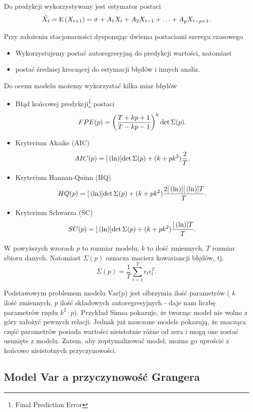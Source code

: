 \documentclass[10pt,a4paper]{book}
\begin{document}
Do predykcji wykorzystywany jest estymator postaci
$$
\predict{X}{t} = \Ex{X_{t+1} } = \sigma + A_1 X_t + A_2 X_{t-1} + \ldots + A_p X_{t-p+1}. 
$$

\begin{remark}
Przy założeniu stacjonarności dysponując dwiema postaciami szeregu czasowego 
\begin{itemize}
\item Wykorzystujemy postać autoregresyjną do predykcji wartości, natomiast
\item postać średniej kroczącej do estymacji błędów i innych analiz.
\end{itemize}
\end{remark}

Do ocenu modelu możemy wykorzystać kilka miar błędów
\begin{itemize}
\item Błąd końcowej predykcji\footnote{Final Prediction Error} postaci 
$$
FPE(p) = {\left( {\frac{T+kp+1}{T-kp-1}} \right)}^k \det \Sigma(p).
$$
\item Kryterium Akaike (AIC)
$$
AIC(p) = {{[}\left( {\ln} \right)}]{\det \Sigma(p)} + (k + pk^2) \frac{2}{T}.
$$
\item Kryterium Hannan-Quinn (HQ) 
$$
HQ(p) = {{[}\left( {\ln} \right)}]{\det \Sigma(p)} + (k + pk^2) \frac{2 {{[}\left( {\ln} \right)}]{{{[}\left( {\ln} \right)}]{T} } }{T}.
$$
\item Kryterium Schwarza (SC) 
$$
SC(p) = {{[}\left( {\ln} \right)}]{\det \Sigma(p)} + (k + pk^2) \frac{{{[}\left( {\ln} \right)}]{T} }{T} .
$$
\end{itemize}
W powyższych wzorach $p$ to rozmiar modelu, $k$ to ilość zmiennych, $T$ rozmiar zbioru danych. Natomiast $\Sigma(p)$ oznacza macierz kowariancji błędów, tj.
$$
\Sigma(p) = \frac{1}{T} \sum_{t=1}^{T} \epsilon_t \epsilon_t^T.
$$

Podstawowym problemem modelu Var(p) jest olbrzymia ilość parametrów ( $k$ ilość zmiennych, $p$ ilość składowych autoregresyjnych - daje nam liczbę parametrów rzędu $ k^2 \cdot p$). Przykład Simsa pokazuje, że tworząc model nie wolno z góry założyć pewnych relacji. Jednak już nauczone modele pokazują, że znacząca część parametrów posiada wartości nieistotnie różne od zera i mogą one zostać usunięte z modelu. Zatem,  aby zoptymalizować model, można go uprościć z końcowo nieistotnych przyczynowości.

\subsection{Model Var a przyczynowość Grangera}
\end{document}
